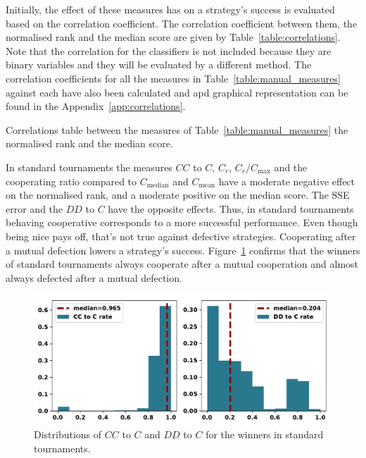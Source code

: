 \documentclass{article}
\begin{document}
Initially, the effect of these measures has on a strategy's success is evaluated
based on the correlation coefficient. The correlation coefficient between them,
the normalised rank and the median score are given by
Table~\ref{table:correlations}. Note that the correlation for the classifiers is
not included because they are binary variables and they will be evaluated by a
different method. The correlation coefficients for all the measures in
Table~\ref{table:manual_measures} against each have also been calculated and apd
graphical representation can be found in the Appendix~\ref{app:correlations}.

\begin{table}[!htbp]
    \begin{center}
    \resizebox{.9\textwidth}{!}{
        
    }
\end{center}
\caption{Correlations table between the measures of Table~\ref{table:manual_measures}
the normalised rank and the median score.}\label{table:correlations}
\end{table}

In standard tournaments the measures  $CC$ to $C$, $C_r$, $C_r / C_{\text{max}}$
and the cooperating ratio compared to $C_{\text{median}}$ and $C_{\text{mean}}$
have a moderate negative effect on the normalised rank, and a moderate positive
on the median score. The SSE error and the $DD$ to $C$ have the opposite
effects. Thus, in standard tournaments behaving cooperative corresponds to a
more successful performance. Even though being nice pays off,
that's not true against defective strategies. Cooperating after a mutual
defection lowers a strategy's success.
Figure~\ref{fig:rates_of_winners_in_standard_tournaments} confirms that the
winners of standard tournaments always cooperate after a mutual cooperation and
almost always defected after a mutual defection.

\begin{figure}[!htbp]
    \centering
    \includegraphics[width=.7\textwidth]{../images/rates_of_winners_in_standard_tournaments.pdf}
    \caption{Distributions of $CC$ to $C$ and $DD$ to $C$ for the winners in
    standard tournaments.}\label{fig:rates_of_winners_in_standard_tournaments}
\end{figure}
\end{document}
